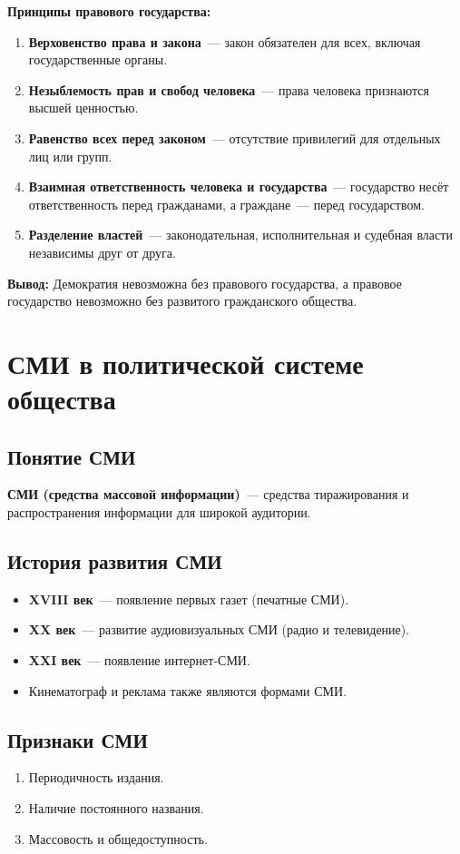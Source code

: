 \documentclass[12pt]{article}
\begin{document}
	\textbf{Принципы правового государства:}
	\begin{enumerate}
		\item \textbf{Верховенство права и закона}~--- закон обязателен для всех, включая государственные органы.
		\item \textbf{Незыблемость прав и свобод человека}~--- права человека признаются высшей ценностью.
		\item \textbf{Равенство всех перед законом}~--- отсутствие привилегий для отдельных лиц или групп.
		\item \textbf{Взаимная ответственность человека и государства}~--- государство несёт ответственность перед гражданами, а граждане~--- перед государством.
		\item \textbf{Разделение властей}~--- законодательная, исполнительная и судебная власти независимы друг от друга.
	\end{enumerate}
	
	\textbf{Вывод:} Демократия невозможна без правового государства, а правовое государство невозможно без развитого гражданского общества.
	
	\section{СМИ в политической системе общества}
	
	\subsection{Понятие СМИ}
	
	\textbf{СМИ (средства массовой информации)}~--- средства тиражирования и распространения информации для широкой аудитории.
	
	\subsection{История развития СМИ}
	\begin{itemize}
		\item \textbf{XVIII век}~--- появление первых газет (печатные СМИ).
		\item \textbf{XX век}~--- развитие аудиовизуальных СМИ (радио и телевидение).
		\item \textbf{XXI век}~--- появление интернет-СМИ.
		\item Кинематограф и реклама также являются формами СМИ.
	\end{itemize}
	
	\subsection{Признаки СМИ}
	\begin{enumerate}
		\item Периодичность издания.
		\item Наличие постоянного названия.
		\item Массовость и общедоступность.
	\end{enumerate}
	
\end{document}
